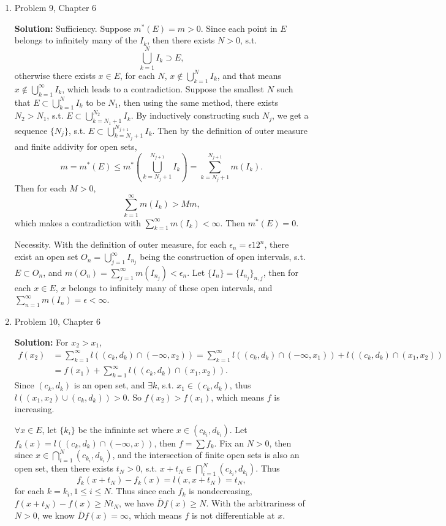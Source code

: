 \documentclass{article}%
\begin{document}
\begin{enumerate}
\item  Problem 9,  Chapter 6 

\smallskip
\textbf{Solution:}
\smallskip
Sufficiency. Suppose $m^*(E) = m > 0$. Since each point in $E$ belongs to infinitely many of the $I_k $, then there exists $N > 0$, s.t. 
$$
\bigcup_{k=1}^N I_k\supset E,
$$
otherwise there exists $x\in E$, for each $N$, $x\notin \bigcup\limits_{k=1}^N I_k $, and that means $x\notin \bigcup\limits_{k=1}^{\infty}I_k $, which leads to a contradiction. Suppose the smallest $N$ such that $E \subset \bigcup\limits_{k=1}^N I_k$ to be $N_1 $, then using the same method, there exists $N_2 > N_1 $, s.t. $E \subset \bigcup\limits_{k=N_1+1}^{N_2} I_k$. By inductively constructing such $N_j $, we get a sequence $\{N_j\}$, s.t. $E \subset \bigcup\limits_{k=N_j+1}^{N_{j+1}} I_k $. Then by the definition of outer measure and finite addivity for open sets, 
$$
m = m^*(E) \le m^*(\bigcup\limits_{k=N_j+1}^{N_{j+1}}I_k) = \sum_{k = N_j+1}^{N_{j+1}}m(I_k).
$$
Then for each $M > 0$,
$$
\sum_{k=1}^{\infty}m(I_k) > Mm, 
$$
which makes a contradiction with $\sum_{k=1}^{\infty}m(I_k) < \infty$. Then $m^*(E) = 0$.

Necessity. With the definition of outer measure, for each $\epsilon_n = \epsilon{1}{2^n} $, there exist an open set $O_n = \bigcup\limits_{j=1}^{\infty}I_{n_j} $ being the construction of open intervals, s.t. $E\subset O_n $, and $m(O_n) = \sum\limits_{j=1}^{\infty}m(I_{n_j}) < \epsilon_n $. Let $\{I_n\} = \{I_{n_j}\}_{n, j} $, then for each $x\in E$, $x$ belongs to infinitely many of these open intervals, and $\sum\limits_{n=1}^{\infty}m(I_n) = \epsilon < \infty$.

\bigskip
\item  Problem 10, Chapter 6

\smallskip
\textbf{Solution:}
\smallskip
For $x_2 > x_1 $, 
$$
\begin{aligned}
f(x_2) &= \sum_{k=1}^{\infty}l((c_k, d_k)\cap (-\infty, x_2)) = \sum_{k=1}^{\infty}l((c_k, d_k)\cap (-\infty, x_1)) + l((c_k, d_k)\cap (x_1, x_2)) \\
&= f(x_1) + \sum_{k=1}^{\infty}l((c_k, d_k)\cap (x_1, x_2)).
\end{aligned}
$$
Since $(c_k, d_k)$ is an open set, and $\exists k$, s.t. $x_1\in(c_k, d_k) $, thus $l((x_1, x_2)\cup (c_k, d_k)) > 0$. So $f(x_2) > f(x_1)$, which means $f$ is increasing.

$\forall x\in E$, let $\{k_i\}$ be the infininte set where $x \in (c_{k_i}, d_{k_i})$. Let $f_k(x) = l((c_k, d_k) \cap (-\infty, x))$, then $f = \sum f_k $. Fix an $N > 0$, then since $x\in\bigcap\limits_{i=1}^{N}(c_{k_i}, d_{k_i}) $, and the intersection of finite open sets is also an open set, then there exists $t_N > 0 $, s.t. $x+t_N \in\bigcap\limits_{i=1}^{N}(c_{k_i}, d_{k_i}) $. Thus 
$$
f_k(x+t_N)-f_k(x) = l(x, x+t_N) = t_N,
$$
for each $k = k_i, 1\le i\le N$. Thus since each $f_k$ is nondecreasing, $f(x+t_N) - f(x) \ge Nt_N$, we have $\overline{D}f(x) \ge N$. With the arbitrariness of $N > 0$, we know $\overline{D}f(x) = \infty$, which means $f$ is not differentiable at $x$.


\end{enumerate}
\end{document}
